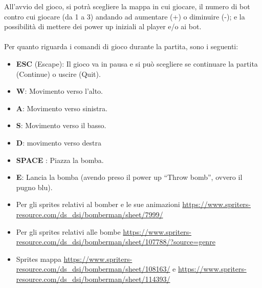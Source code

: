 \documentclass[a4paper,12pt]{report}
\begin{document}
All’avvio del gioco, si potrà scegliere la mappa in cui giocare, il numero di bot contro cui giocare (da 1 a 3) andando ad aumentare (+) o diminuire (-); e la possibilità di mettere dei power up iniziali al player e/o ai bot.
\\
\\
Per quanto riguarda i comandi di gioco durante la partita, sono i seguenti:
\begin{itemize}
    \item \textbf{ESC} (Escape): Il gioco va in pausa e si può scegliere se continuare la partita (Continue) o uscire (Quit).
    \item \textbf{W}: Movimento verso l'alto.
    \item \textbf{A}: Movimento verso sinistra.
    \item \textbf{S}: Movimento verso il basso.
    \item \textbf{D}: movimento verso destra
    \item \textbf{SPACE} : Piazza la bomba.
    \item \textbf{E}: Lancia la bomba (avendo preso il power up “Throw bomb”, ovvero il pugno blu).
\end{itemize}



\begin{itemize}
    \item Per gli sprites relativi al bomber e le sue animazioni  \url{https://www.spriters-resource.com/ds_dsi/bomberman/sheet/7999/}
    \item Per gli sprites relativi alle bombe \url{https://www.spriters-resource.com/ds_dsi/bomberman/sheet/107788/?source=genre}
    \item Sprites mappa \url{https://www.spriters-resource.com/ds_dsi/bomberman/sheet/108163/} e \url{https://www.spriters-resource.com/ds_dsi/bomberman/sheet/114393/}
\end{itemize}
\end{document}
